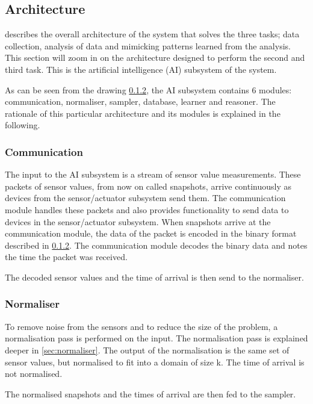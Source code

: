 \subsection{Architecture}

 describes the overall architecture of the system that solves the three tasks; data collection, analysis of data and mimicking patterns learned from the analysis. This section will zoom in on the architecture designed to perform the second and third task. This is the artificial intelligence (AI) subsystem of the system.


As can be seen from the drawing \cref{}, the AI subsystem contains 6 modules: communication, normaliser, sampler, database, learner and reasoner. The rationale of this particular architecture and its modules is explained in the following.

\subsubsection{Communication}
The input to the AI subsystem is a stream of sensor value measurements. These packets of sensor values, from now on called snapshots, arrive continuously as devices from the sensor/actuator subsystem send them. The communication module handles these packets and also provides functionality to send data to devices in the sensor/actuator subsystem. When snapshots arrive at the communication module, the data of the packet is encoded in the binary format described in \cref{}. The communication module decodes the binary data and notes the time the packet was received.

The decoded sensor values and the time of arrival is then send to the normaliser.

\subsubsection{Normaliser}
To remove noise from the sensors and to reduce the size of the problem, a normalisation pass is performed on the input. The normalisation pass is explained deeper in \cref{sec:normaliser}. The output of the normalisation is the same set of sensor values, but normalised to fit into a domain of size k. The time of arrival is not normalised.

The normalised snapshots and the times of arrival are then fed to the sampler.

